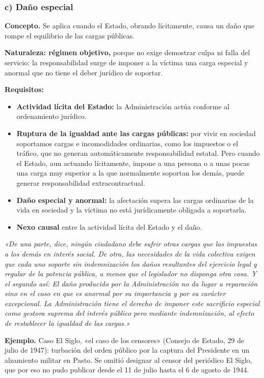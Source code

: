 \subsubsection{c) Daño especial}
\textbf{Concepto.} Se aplica cuando el Estado, obrando lícitamente, causa un daño que rompe el equilibrio de las cargas públicas.

\textbf{Naturaleza: régimen objetivo,} porque no exige demostrar culpa ni falla del servicio: la responsabilidad surge de imponer a la víctima una carga especial y anormal que no tiene el deber jurídico de soportar.

\textbf{Requisitos:}

\begin{itemize}
\item \textbf{Actividad lícita del Estado:} la Administración actúa conforme al ordenamiento jurídico.
\item \textbf{Ruptura de la igualdad ante las cargas públicas:} por vivir en sociedad soportamos cargas e incomodidades ordinarias, como los impuestos o el tráfico, que no generan automáticamente responsabilidad estatal. Pero cuando el Estado, aun actuando lícitamente, impone a una persona o a unas pocas una carga muy superior a la que normalmente soportan los demás, puede generar responsabilidad extracontractual.
\item \textbf{Daño especial y anormal:} la afectación supera las cargas ordinarias de la vida en sociedad y la víctima no está jurídicamente obligada a soportarla.
\item \textbf{Nexo causal} entre la actividad lícita del Estado y el daño.
\end{itemize}
\begin{cita}
\textit{«De una parte, dice, ningún ciudadano debe sufrir otras cargas que las impuestas a los demás en interés social. De otra, las necesidades de la vida colectiva exigen que cada uno soporte sin indemnización los daños resultantes del ejercicio legal y regular de la potencia pública, a menos que el legislador no disponga otra cosa. Y el segundo así: El daño producido por la Administración no da lugar a reparación sino en el caso en que es anormal por su importancia y por su carácter excepcional. La Administración tiene el derecho de imponer este sacrificio especial como gestora suprema del interés público pero mediante indemnización, al efecto de restablecer la igualdad de las cargas.»}
\end{cita}
\begin{ejemplo}
\textcolor[HTML]{4F6228}{\textbf{Ejemplo. }}Caso El Siglo, «el caso de los censores» (Consejo de Estado, 29 de julio de 1947): turbación del orden público por la captura del Presidente en un alzamiento militar en Pasto. Se omitió designar al censor del periódico El Siglo, que por eso no pudo publicar desde el 11 de julio hasta el 6 de agosto de 1944.
\end{ejemplo}
